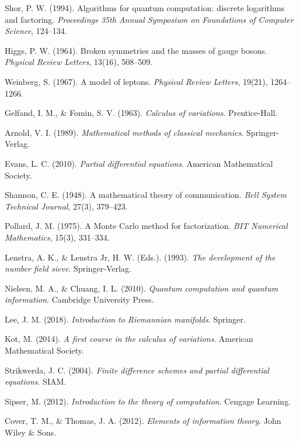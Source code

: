 \documentclass[12pt,a4paper]{article}
\begin{document}
	\begin{thebibliography}{99}
		Shor, P. W. (1994). Algorithms for quantum computation: discrete logarithms and factoring. \textit{Proceedings 35th Annual Symposium on Foundations of Computer Science}, 124--134.
		
		Higgs, P. W. (1964). Broken symmetries and the masses of gauge bosons. \textit{Physical Review Letters}, 13(16), 508--509.
		
		Weinberg, S. (1967). A model of leptons. \textit{Physical Review Letters}, 19(21), 1264--1266.
		
		Gelfand, I. M., \& Fomin, S. V. (1963). \textit{Calculus of variations}. Prentice-Hall.
		
		Arnold, V. I. (1989). \textit{Mathematical methods of classical mechanics}. Springer-Verlag.
		
		Evans, L. C. (2010). \textit{Partial differential equations}. American Mathematical Society.
		
		Shannon, C. E. (1948). A mathematical theory of communication. \textit{Bell System Technical Journal}, 27(3), 379--423.
		
		Pollard, J. M. (1975). A Monte Carlo method for factorization. \textit{BIT Numerical Mathematics}, 15(3), 331--334.
		
		Lenstra, A. K., \& Lenstra Jr, H. W. (Eds.). (1993). \textit{The development of the number field sieve}. Springer-Verlag.
		
		Nielsen, M. A., \& Chuang, I. L. (2010). \textit{Quantum computation and quantum information}. Cambridge University Press.
		
		Lee, J. M. (2018). \textit{Introduction to Riemannian manifolds}. Springer.
		
		Kot, M. (2014). \textit{A first course in the calculus of variations}. American Mathematical Society.
		
		Strikwerda, J. C. (2004). \textit{Finite difference schemes and partial differential equations}. SIAM.
		
		Sipser, M. (2012). \textit{Introduction to the theory of computation}. Cengage Learning.
		
		Cover, T. M., \& Thomas, J. A. (2012). \textit{Elements of information theory}. John Wiley \& Sons.
	\end{thebibliography}
	
\end{document}
